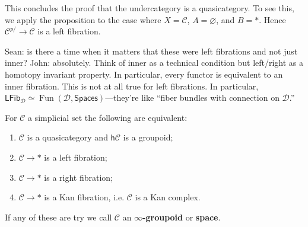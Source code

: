 \documentclass{amsart}
\DeclareMathOperator{\Fun}{Fun}
\begin{document}
This concludes the proof that the undercategory is a quasicategory. To see this,
we apply the proposition to the case where $X=\mathcal{C}$, $A=\varnothing$, and $B=*$.
Hence $\mathcal{C}^{p/}\to \mathcal{C}$ is a left fibration.

Sean: is there a time when it matters that these were left fibrations and not just inner?
John: absolutely. Think of inner as a technical condition but left/right as a homotopy
invariant property. In particular, every functor is equivalent to an inner fibration.
This is not at all true for left fibrations. In particular,
$\mathsf{LFib}_\mathcal{D}\simeq \Fun(\mathcal{D},\mathsf{Spaces})$---they're
like ``fiber bundles with connection on $\mathcal{D}$.''

\begin{proposition}[HTT 1.2.5.1]
    For $\mathcal{C}$ a simplicial set the following are equivalent:
    \begin{enumerate}
        \item $\mathcal{C}$ is a quasicategory and $\mathsf{h}\mathcal{C}$ is a groupoid;
        \item $\mathcal{C}\to *$ is a left fibration;
        \item $\mathcal{C}\to *$ is a right fibration;
        \item $\mathcal{C}\to *$ is a Kan fibration, i.e. $\mathcal{C}$ is a Kan complex.
    \end{enumerate}
    If any of these are try we call $\mathcal{C}$ an \textbf{$\infty$-groupoid} or \textbf{space}.
\end{proposition}
\end{document}
